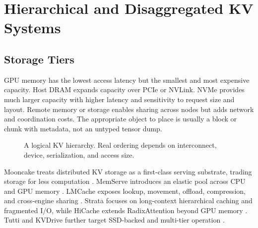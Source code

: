 \documentclass[conference,10pt]{IEEEtran}
\begin{document}
\section{Hierarchical and Disaggregated KV Systems}

\subsection{Storage Tiers}

GPU memory has the lowest access latency but the smallest and most expensive capacity. Host DRAM expands capacity over PCIe or NVLink. NVMe provides much larger capacity with higher latency and sensitivity to request size and layout. Remote memory or storage enables sharing across nodes but adds network and coordination costs. The appropriate object to place is usually a block or chunk with metadata, not an untyped tensor dump.

\begin{figure}[t]
\centering
{}
\caption{A logical KV hierarchy. Real ordering depends on interconnect, device, serialization, and access size.}
\label{fig:hierarchy}
\end{figure}

Mooncake treats distributed KV storage as a first-class serving substrate, trading storage for less computation \cite{qin2025mooncake}. MemServe introduces an elastic pool across CPU and GPU memory \cite{hu2024memserve}. LMCache exposes lookup, movement, offload, compression, and cross-engine sharing \cite{liu2025lmcache,d05lmcacheproject}. Strata focuses on long-context hierarchical caching and fragmented I/O, while HiCache extends RadixAttention beyond GPU memory \cite{xie2025strata,d03sglangproject}. Tutti and KVDrive further target SSD-backed and multi-tier operation \cite{qiu2026tutti,lin2026kvdrive}.
\end{document}
